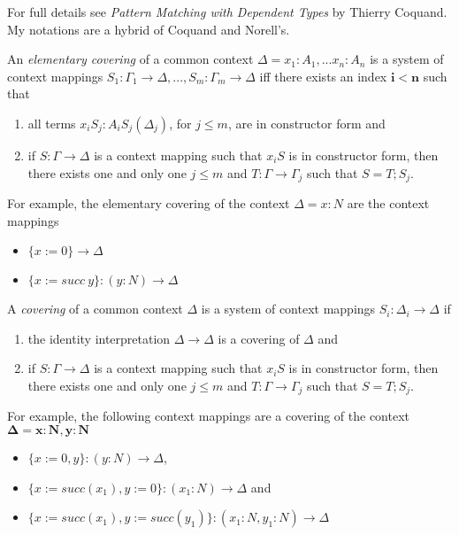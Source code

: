 For full details see \textit{Pattern Matching with Dependent Types} by Thierry Coquand. My notations are a hybrid of Coquand and Norell's.

An \textit{elementary covering} of a common context $\Delta = x_1 : A_1,...x_n : A_n$ is a system of context mappings $S_1 : \Gamma_1 \to \Delta, ..., S_m : \Gamma_m \to \Delta$ iff there exists an index $\boldsymbol{i < n}$ such that

\begin{enumerate}
  \item all terms $x_iS_j : A_iS_j(\Delta_j)$, for $j \leq m$, are in constructor form and
  \item if $S : \Gamma \to \Delta$ is a context mapping such that $x_iS$ is in constructor form, then there exists one and only one $j \leq m$ and $T : \Gamma \to \Gamma_j$ such that $S=T;S_j$.
  
\end{enumerate}

For example, the elementary covering of the context $\Delta = x : N$ are the context mappings

\begin{itemize}
  \item $\{x := 0\} \to \Delta$
  \item $\{x := succ \ y \} : (y : N) \to \Delta$
\end{itemize}

A \textit{covering} of a common context $\Delta$ is a system of context mappings $S_i : \Delta_i \to \Delta$ if

\begin{enumerate}
  \item the identity interpretation $\Delta \to \Delta$ is a covering of $\Delta$ and
  \item if $S : \Gamma \to \Delta$ is a context mapping such that $x_iS$ is in constructor form, then there exists one and only one $j \leq m$ and $T : \Gamma \to \Gamma_j$ such that $S = T;S_j$. 
\end{enumerate}

For example, the following context mappings are a covering of the context $\boldsymbol{\Delta = x : N, y : N}$

\begin{itemize}
  \item $\{x := 0, y\} : (y : N) \to \Delta$,
  \item $\{x := succ(x_1), y:= 0\} : (x_1 : N) \to \Delta$ and
  \item $\{x := succ(x_1), y:= succ(y_1)\} : (x_1 : N, y_1 : N) \to \Delta$
\end{itemize}

